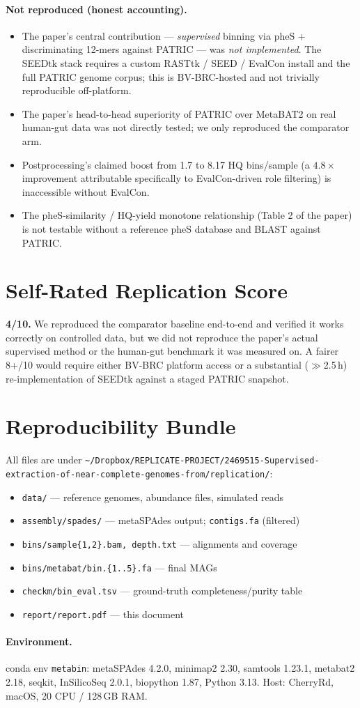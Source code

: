 \documentclass[11pt]{article}
\begin{document}
\paragraph{Not reproduced (honest accounting).}
\begin{itemize}
  \item The paper's central contribution --- \emph{supervised} binning via
  pheS + discriminating 12-mers against PATRIC --- was \emph{not implemented}.
  The SEEDtk stack requires a custom RASTtk / SEED / EvalCon install and the
  full PATRIC genome corpus; this is BV-BRC-hosted and not trivially
  reproducible off-platform.
  \item The paper's head-to-head superiority of PATRIC over MetaBAT2 on real
  human-gut data was not directly tested; we only reproduced the
  comparator arm.
  \item Postprocessing's claimed boost from 1.7 to 8.17 HQ bins/sample
  (a $4.8\times$ improvement attributable specifically to EvalCon-driven role
  filtering) is inaccessible without EvalCon.
  \item The pheS-similarity / HQ-yield monotone relationship (Table 2 of the
  paper) is not testable without a reference pheS database and BLAST against
  PATRIC.
\end{itemize}

\section{Self-Rated Replication Score}

\textbf{4/10.} We reproduced the comparator baseline end-to-end and verified it
works correctly on controlled data, but we did not reproduce the paper's
actual supervised method or the human-gut benchmark it was measured on. A
fairer 8+/10 would require either BV-BRC platform access or a substantial
($\gg$2.5\,h) re-implementation of SEEDtk against a staged PATRIC snapshot.

\section{Reproducibility Bundle}

All files are under
\texttt{\textasciitilde/Dropbox/REPLICATE-PROJECT/2469515-Supervised-extraction-of-near-complete-genomes-from/replication/}:

\begin{itemize}
  \item \texttt{data/} --- reference genomes, abundance files, simulated reads
  \item \texttt{assembly/spades/} --- metaSPAdes output; \texttt{contigs.fa} (filtered)
  \item \texttt{bins/sample\{1,2\}.bam, depth.txt} --- alignments and coverage
  \item \texttt{bins/metabat/bin.\{1..5\}.fa} --- final MAGs
  \item \texttt{checkm/bin\_eval.tsv} --- ground-truth completeness/purity table
  \item \texttt{report/report.pdf} --- this document
\end{itemize}

\paragraph{Environment.}
conda env \texttt{metabin}: metaSPAdes 4.2.0, minimap2 2.30, samtools 1.23.1,
metabat2 2.18, seqkit, InSilicoSeq 2.0.1, biopython 1.87, Python 3.13.
Host: CherryRd, macOS, 20 CPU / 128\,GB RAM.
\end{document}
